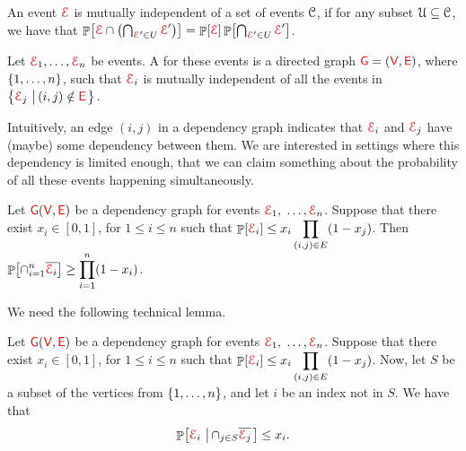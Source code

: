 \begin{defn}
    An event ${\textcolor{red}{\EuScript{E}}}$ is mutually independent of a set of events
    $\EuScript{C}$, if for any subset $\EuScript{U} \subseteq
    \EuScript{C}$, we have that 
    $\Prob{\Event \cap \pth{\bigcap_{\Event' \in U} \Event'}}
    =\Prob{\Event } \Prob{\bigcap_{\Event' \in U} \Event'}$.
     

    Let ${\textcolor{red}{\EuScript{E}}}_1, \ldots, {\textcolor{red}{\EuScript{E}}}_n$ be events. A  for these events is a directed graph
    ${\textcolor{red}{\mathsf{G}}}=({\textcolor{red}{\mathsf{V}}},{\textcolor{red}{\mathsf{E}}})$, where $\left\{ {1,\ldots, n} \right\}$, such that
    ${\textcolor{red}{\EuScript{E}}}_i$ is mutually independent of all the events in $\left\{ {
       {\textcolor{red}{\EuScript{E}}}_j \,\left|\, { (i,j) \notin {\textcolor{red}{\mathsf{E}}}} \bigr.\right.} \right\}$.
\end{defn}

Intuitively, an edge $(i,j)$ in a dependency graph indicates that
${\textcolor{red}{\EuScript{E}}}_i$ and ${\textcolor{red}{\EuScript{E}}}_j$ have (maybe) some dependency between them.  We are
interested in settings where this dependency is limited enough, that
we can claim something about the probability of all these events
happening simultaneously.

\begin{lemma}%
    Let ${\textcolor{red}{\mathsf{G}}}({\textcolor{red}{\mathsf{V}}},{\textcolor{red}{\mathsf{E}}})$ be a dependency graph for events
    ${\textcolor{red}{\EuScript{E}}}_1,$ $\ldots, {\textcolor{red}{\EuScript{E}}}_n$. Suppose that there exist $x_i \in
    [0,1]$, for $1 \leq i \leq n$ such that $\ds \Prob{\Event_i} \leq
    x_i \prod_{(i,j) \in E} \pth{1-x_j}$.  Then $\ds
    \Prob{\cap_{i=1}^{n} \overline{\Event_i}} \geq \prod_{i=1}^{n}
    \pth{1-x_i}$.
\end{lemma}

We need the following technical lemma.

\begin{lemma}
    Let ${\textcolor{red}{\mathsf{G}}}({\textcolor{red}{\mathsf{V}}},{\textcolor{red}{\mathsf{E}}})$ be a dependency graph for events
    ${\textcolor{red}{\EuScript{E}}}_1,$ $\ldots, {\textcolor{red}{\EuScript{E}}}_n$. Suppose that there exist $x_i \in
    [0,1]$, for $1 \leq i \leq n$ such that $\ds \Prob{\Event_i} \leq
    x_i \prod_{(i,j) \in E} \pth{1-x_j}$.  Now, let $S$ be a subset of
    the vertices from $\left\{ {1, \ldots, n} \right\}$, and let $i$ be an index
    not in $S$.  We have that
    \begin{align}
        \Prob{\Event_i \sep{ \cap_{j \in S} \overline{\Event_j}}} \leq
        x_i.        
        \eqlab{ind}
    \end{align}
\end{lemma}



